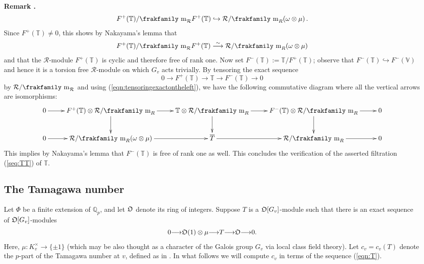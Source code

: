 \documentclass[12pt]{amsart}
\numberwithin{equation}{section}
\newenvironment{rem}{\par\medskip\noindent\refstepcounter{thm}
\bgroup{\hspace*{-0.15 cm}\bf{Remark} \thethm.}\bgroup}{\egroup
\egroup\par\medskip} \parskip 2pt
\begin{document}
\begin{rem}
$${F}^+(\mathbb{T})/{\hbox{\frakfamily m}}_{\mathcal{R}}{F}^+(\mathbb{T})\hookrightarrow \mathcal{R}/{\hbox{\frakfamily m}}_R(\omega\otimes\mu)\,.$$
Since ${F}^+(\mathbb{T})\neq 0$, this shows by Nakayama's lemma that
\begin{equation}\label{eqn:tensoringexactontheleft} 
F^+(\mathbb{T})/{\hbox{\frakfamily m}}_{\mathcal{R}}{F}^+(\mathbb{T})\stackrel{\sim}{\longrightarrow} \mathcal{R}/{\hbox{\frakfamily m}}_R(\omega\otimes\mu)
\end{equation}
 and that the ${\mathcal{R}}$-module ${F}^+(\mathbb{T})$ is cyclic and therefore free of rank one. Now set ${F}^-(\mathbb{T}):={\mathbb{T}}/{F}^+(\mathbb{T})$; observe that ${F}^-(\mathbb{T})\hookrightarrow {F}^-(\mathbb{V})$ and hence it is a torsion free ${\mathcal{R}}$-module on which $G_v$ acts trivially. By tensoring the exact sequence 
 $$0 {\longrightarrow}{F}^+(\mathbb{T}) {\longrightarrow} \mathbb{T} {\longrightarrow}{F}^-(\mathbb{T})  {\longrightarrow} 0$$
 by ${\mathcal{R}}/{\hbox{\frakfamily m}}_{\mathcal{R}}$ and using (\ref{eqn:tensoringexactontheleft}), we have the following commutative diagram where all the vertical arrows are isomorphisms:
$$\xymatrix{0 \ar[r]&{F}^+(\mathbb{T})\otimes \mathcal{R}/{\hbox{\frakfamily m}}_R\ar[d] \ar[r] &\mathbb{T}\otimes\mathcal{R}/{\hbox{\frakfamily m}}_R \ar[r]\ar[d]&{F}^-(\mathbb{T})\otimes \mathcal{R}/{\hbox{\frakfamily m}}_R  \ar[r]\ar[d]& 0\\
0\ar[r]& \mathcal{R}/{\hbox{\frakfamily m}}_R(\omega\otimes\mu) \ar[r]& \overline{T} \ar[r]& \mathcal{R}/{\hbox{\frakfamily m}}_R\ar[r]&0}$$
This implies by Nakayama's lemma that $F^-(\mathbb{T})$ is free of rank one as well. This concludes the verification of the asserted filtration (\ref{seq:TT}) of ${\mathbb{T}}$.
\end{rem}
 \subsection{The Tamagawa number}
 Let ${\Phi}$ be a finite extension of ${\mathbb{Q}}_p$, and let $\frak{O}$ denote its ring of integers. Suppose $T$ is a $\frak{O}[G_v]$-module such that there is an exact sequence of $\frak{O}[G_v]$-modules
 \begin{equation}\label{eqn:T}0{\longrightarrow}\frak{O}(1)\otimes\mu {\longrightarrow} T {\longrightarrow} \frak{O} {\longrightarrow} 0.\end{equation}
  Here, $\mu: K_v^{\times}{\rightarrow} \{\pm 1\}$ (which may be also thought as a character of the Galois group $G_v$ via local class field theory). Let $c_v=c_v(T)$ denote the $p$-part of the Tamagawa number at $v$, defined as in \cite{FPR91}. In what follows we will compute $c_v$ in terms of the sequence (\ref{eqn:T}). 
\end{document}
